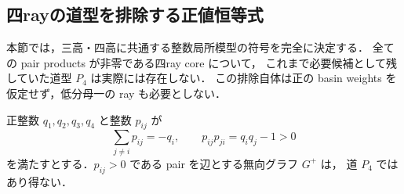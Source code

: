 \subsection{四rayの道型を排除する正値恒等式}
\label{fh25:section}

本節では，三高・四高に共通する整数局所模型の符号を完全に決定する．
全ての pair products が非零である四ray core について，
これまで必要候補として残していた道型 $P_4$ は実際には存在しない．
この排除自体は正の basin weights を仮定せず，低分母一の ray も必要としない．

\begin{theorem}[整数四ray模型における道型の非存在]
\label{fh25:no-path}
正整数 $q_1,q_2,q_3,q_4$ と整数 $p_{ij}$ が
\begin{equation}
 \sum_{j\ne i}p_{ij}=-q_i,\qquad
 p_{ij}p_{ji}=q_iq_j-1>0
 \label{fh25:raw-equations}
\end{equation}
を満たすとする．$p_{ij}>0$ である pair を辺とする無向グラフ $G^+$ は，
道 $P_4$ ではあり得ない．
\end{theorem}

